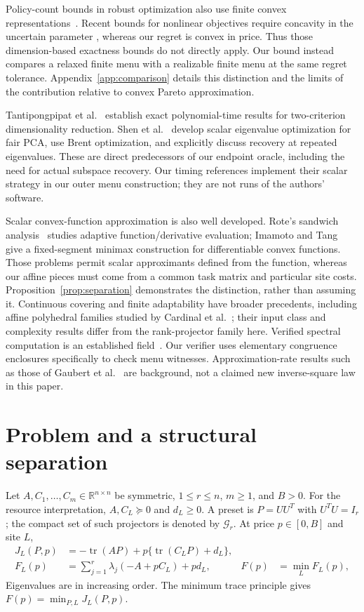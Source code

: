 \documentclass[11pt]{article}
\newcommand{\tr}{\operatorname{tr}}
\newcommand{\Gr}{\mathcal G_r}
\newcommand{\R}{\mathbb R}
\begin{document}
Policy-count bounds in robust optimization also use finite convex
representations~\cite{hanasusanto2015,buchheim2017}. Recent bounds for
nonlinear objectives require concavity in the uncertain parameter
\cite{kurtz2026}, whereas our regret is convex in price. Thus those
dimension-based exactness bounds do not directly apply. Our bound instead
compares a relaxed finite menu with a realizable finite menu at the same
regret tolerance. Appendix~\ref{app:comparison} details this distinction
and the limits of the contribution relative to convex Pareto approximation.

Tantipongpipat et al.~\cite{tantipongpipat2019} establish exact polynomial-time
results for two-criterion dimensionality reduction. Shen et al.~\cite{shen2026}
develop scalar eigenvalue optimization for fair PCA, use Brent optimization,
and explicitly discuss recovery at repeated eigenvalues. These are direct
predecessors of our endpoint oracle, including the need for actual subspace
recovery. Our timing references implement their scalar strategy in our
outer menu construction; they are not runs of the authors' software.

Scalar convex-function approximation is also well developed. Rote's
sandwich analysis~\cite{rote1992} studies adaptive function/derivative
evaluation; Imamoto and Tang~\cite{imamoto2008} give a fixed-segment minimax
construction for differentiable convex functions. Those problems permit
scalar approximants defined from the function, whereas our affine pieces
must come from a common task matrix and particular site costs.
Proposition~\ref{prop:separation} demonstrates the distinction, rather than
assuming it. Continuous covering and finite adaptability have broader
precedents, including affine polyhedral families studied by Cardinal et
al.~\cite{cardinal2025}; their input class and complexity results differ
from the rank-projector family here. Verified spectral computation is an
established field~\cite{rump2022}. Our verifier uses elementary congruence
enclosures specifically to check menu witnesses. Approximation-rate results
such as those of Gaubert et al.~\cite{gaubert2011} are background, not a
claimed new inverse-square law in this paper.

\section{Problem and a structural separation}
Let $A,C_1,\ldots,C_m\in\R^{n\times n}$ be symmetric, $1\le r\le n$,
$m\ge1$, and $B>0$. For the resource interpretation, $A,C_L\succeq0$
and $d_L\ge0$. A preset is $P=UU^T$ with $U^TU=I_r$; the compact set
of such projectors is denoted by $\Gr$. At price $p\in[0,B]$ and site $L$,
\begin{align}
 J_L(P,p)&=-\tr(AP)+p\{\tr(C_LP)+d_L\},\\
 F_L(p)&=\sum_{j=1}^r\lambda_j(-A+pC_L)+pd_L,
 &F(p)&=\min_L F_L(p),                                      \label{eq:F}
\end{align}
Eigenvalues are in increasing order. The minimum trace principle gives
$F(p)=\min_{P,L}J_L(P,p)$.
\end{document}
